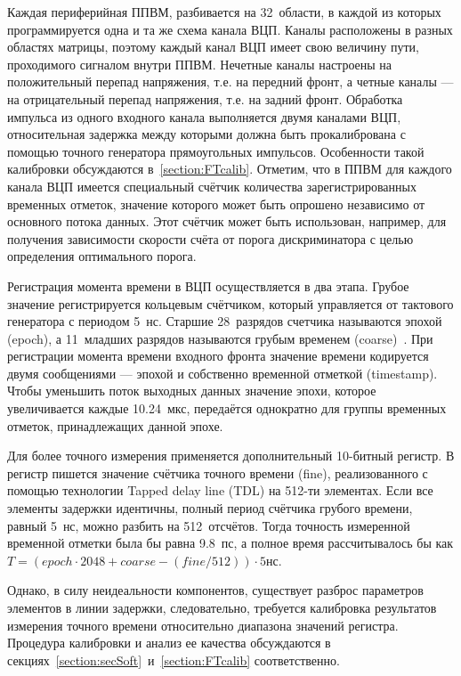 Каждая периферийная ППВМ, разбивается на 32~области, в каждой из которых программируется одна и та же схема канала ВЦП. 
Каналы расположены в разных областях матрицы, поэтому каждый канал ВЦП имеет свою величину пути, проходимого сигналом внутри ППВМ.
Нечетные каналы настроены на положительный перепад напряжения, т.е. на передний фронт, а четные каналы --- на отрицательный перепад напряжения, т.е. на задний фронт. Обработка импульса из одного входного канала выполняется двумя каналами ВЦП, относительная задержка между которыми должна быть прокалибрована с помощью точного генератора прямоугольных импульсов. Особенности такой калибровки обсуждаются в~\ref{section:FTcalib}. Отметим, что в ППВМ для каждого канала ВЦП имеется специальный счётчик количества зарегистрированных временных отметок, значение которого может быть опрошено независимо от основного потока данных. Этот счётчик может быть использован, например, для получения зависимости скорости счёта от порога дискриминатора с целью определения оптимального порога.

Регистрация момента времени в ВЦП осуществляется в два этапа. Грубое значение регистрируется кольцевым счётчиком, который управляется от тактового генератора с периодом 5~нс. Старшие 28~разрядов счетчика называются эпохой (epoch), а 11~младших разрядов называются грубым временем (coarse)~\cite{CAHIT}. При регистрации момента времени входного фронта значение времени кодируется двумя сообщениями --- эпохой и собственно временной отметкой (timestamp). Чтобы уменьшить поток выходных данных значение эпохи, которое увеличивается каждые 10.24~мкс, передаётся однократно для группы временных отметок, принадлежащих данной эпохе.

Для более точного измерения применяется дополнительный 10-битный регистр. В регистр пишется значение счётчика точного времени (fine), реализованного с помощью технологии Tapped delay line (TDL) на 512-ти элементах. Если все элементы задержки идентичны, полный период счётчика грубого времени, равный 5~нс, можно разбить на 512~отсчётов. Тогда точность измеренной временной отметки была бы равна 9.8~пс, а полное время рассчитывалось бы как $ T = (epoch \cdot 2048 + coarse - (fine/512)) \cdot 5 $нс.

Однако, в силу неидеальности компонентов, существует разброс параметров элементов в линии задержки, следовательно, требуется калибровка результатов измерения точного времени относительно диапазона значений регистра. Процедура калибровки и анализ ее качества обсуждаются в секциях~\ref{section:secSoft}~и~\ref{section:FTcalib} соответственно.

